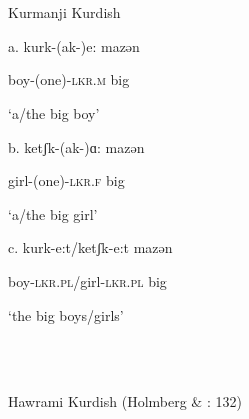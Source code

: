 \documentclass[output=paper]{langsci/langscibook}
\begin{document}
\begin{styleSfondomedioiColorexxi}
\ea%
    \label{ex:key:19}
    \gll\\
        \\
    \glt
    \z

          Kurmanji Kurdish \citep{FrancoEtAl2015}
\end{styleSfondomedioiColorexxi}

\begin{styleSfondomedioiColorexxi}
a.  kurk-(ak-)e:     mazən       
\end{styleSfondomedioiColorexxi}

\begin{styleSfondomedioiColorexxi}
    boy-(one)-\textsc{lkr.m}    big     
\end{styleSfondomedioiColorexxi}

\begin{styleSfondomedioiColorexxi}
    ‘a/the big boy’
\end{styleSfondomedioiColorexxi}

\begin{styleSfondomedioiColorexxi}
  b.   ketʃk-(ak-)ɑ:    mazən      
\end{styleSfondomedioiColorexxi}

\begin{styleSfondomedioiColorexxi}
    girl-(one)-\textsc{lkr.f}   big     
\end{styleSfondomedioiColorexxi}

\begin{styleSfondomedioiColorexxi}
    ‘a/the big girl’
\end{styleSfondomedioiColorexxi}

\begin{styleSfondomedioiColorexxi}
   c.  kurk-e:t/ketʃk-e:t     mazən     
\end{styleSfondomedioiColorexxi}

\begin{styleSfondomedioiColorexxi}
    boy-\textsc{lkr.pl}/girl-\textsc{lkr.pl}  big   
\end{styleSfondomedioiColorexxi}

\begin{styleSfondomedioiColorexxi}
    ‘the big boys/girls’
\end{styleSfondomedioiColorexxi}

\begin{styleSfondomedioiColorexxi}
\ea%
    \label{ex:key:20}
    \gll\\
        \\
    \glt
    \z

           Hawrami Kurdish (Holmberg \& \citealt{Odden2008}: 132)
\end{styleSfondomedioiColorexxi}
\end{document}
